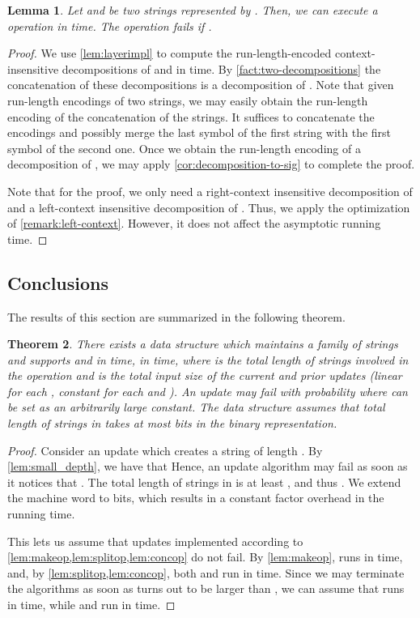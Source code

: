 \documentclass[a4paper]{article}
\newtheorem{theorem}{Theorem}[section]
\newtheorem{lemma}[theorem]{Lemma}
\theoremstyle{remark}
\begin{document}
\begin{lemma}\label{lem:concop}
Let  and  be two strings represented by .
Then, we can execute a  operation in  time.
The operation fails if .
\end{lemma}

\begin{proof}
We use \cref{lem:layerimpl} to compute the run-length-encoded context-insensitive decompositions of  and  in  time.
By \cref{fact:two-decompositions} the concatenation of these decompositions is a decomposition of .
Note that given run-length encodings of two strings, we may easily obtain the run-length encoding of the concatenation of the strings.
It suffices to concatenate the encodings and possibly merge the last symbol of the first string with the first symbol of the second one.
Once we obtain the run-length encoding of a decomposition of , we may apply \cref{cor:decomposition-to-sig} to complete the proof.

Note that for the proof, we only need a right-context insensitive decomposition of  and a left-context insensitive decomposition of .
Thus, we apply the optimization of \cref{remark:left-context}.
However, it does not affect the asymptotic running time.
\end{proof}

\subsection{Conclusions}\label{sec:conclusions}

The results of this section are summarized in the following theorem.

\begin{theorem}\label{thm:data_structure}
There exists a data structure which maintains a family of strings  and supports  and  in 
time,  in  time, where  is the total length of strings involved in the operation and 
is the total input size of the current and prior updates (linear for each , constant for each  and ).
An update may fail with probability  where  can be set as an arbitrarily large constant.
The data structure assumes that total length of strings in  takes at most  bits in the binary representation.
\end{theorem}

\begin{proof}
Consider an update which creates a string  of length .
By \cref{lem:small_depth}, we have that 
Hence, an update algorithm may fail as soon as it notices that .
The total length of strings in  is at least , and thus .
We extend the machine word to  bits, which results in a constant factor overhead in the running time.

This lets us assume that updates implemented according to \cref{lem:makeop,lem:splitop,lem:concop} do not fail.
By \cref{lem:makeop},  runs in  time, and, by \cref{lem:splitop,lem:concop}, both  and  run in  time.
Since we may terminate the algorithms as soon as  turns out to be larger than ,
we can assume that  runs in  time, while  and  run in  time.
\end{proof}
\end{document}
